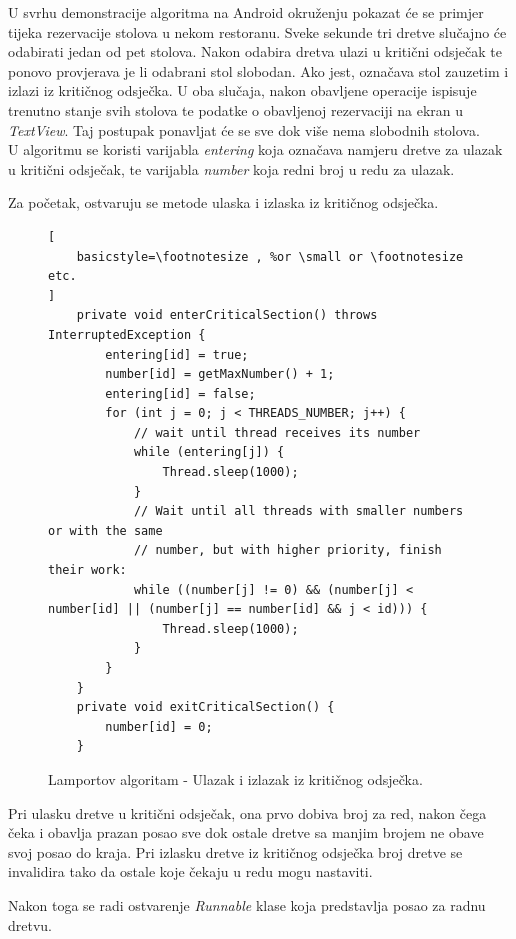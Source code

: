 \documentclass[times, utf8, zavrsni]{fer}
\begin{document}
U svrhu demonstracije algoritma na Android okruženju pokazat će se primjer tijeka rezervacije stolova u nekom restoranu. Sveke sekunde tri dretve slučajno će odabirati jedan od pet stolova. Nakon odabira dretva ulazi u kritični odsječak te ponovo provjerava je li odabrani stol slobodan. Ako jest, označava stol zauzetim i izlazi iz kritičnog odsječka. U oba slučaja, nakon obavljene operacije ispisuje trenutno stanje svih stolova te podatke o obavljenoj rezervaciji na ekran u \textit{TextView}. Taj postupak ponavljat će se sve dok više nema slobodnih stolova.\\

U algoritmu se koristi varijabla \textit{entering} koja označava namjeru dretve za ulazak u kritični odsječak, te varijabla \textit{number} koja redni broj u redu za ulazak.\newpage


Za početak, ostvaruju se metode ulaska i izlaska iz kritičnog odsječka.

\begin{figure}[ht!]
\begin{lstlisting}[
    basicstyle=\footnotesize , %or \small or \footnotesize etc.
]
    private void enterCriticalSection() throws InterruptedException {
        entering[id] = true;
        number[id] = getMaxNumber() + 1;
        entering[id] = false;
        for (int j = 0; j < THREADS_NUMBER; j++) {
            // wait until thread receives its number
            while (entering[j]) {
                Thread.sleep(1000);
            }
            // Wait until all threads with smaller numbers or with the same
            // number, but with higher priority, finish their work:
            while ((number[j] != 0) && (number[j] < number[id] || (number[j] == number[id] && j < id))) {
                Thread.sleep(1000);
            }
        }
    }
    private void exitCriticalSection() {
        number[id] = 0;
	}
\end{lstlisting}
\caption{Lamportov algoritam - Ulazak i izlazak iz kritičnog odsječka.}
\label{overflow}
\end{figure}

Pri ulasku dretve u kritični odsječak, ona prvo dobiva broj za red, nakon čega čeka i obavlja prazan posao sve dok ostale dretve sa manjim brojem ne obave svoj posao do kraja. Pri izlasku dretve iz kritičnog odsječka broj dretve se invalidira tako da ostale koje čekaju u redu mogu nastaviti.\newpage

Nakon toga se radi ostvarenje \textit{Runnable} klase koja predstavlja posao za radnu dretvu.
\end{document}
